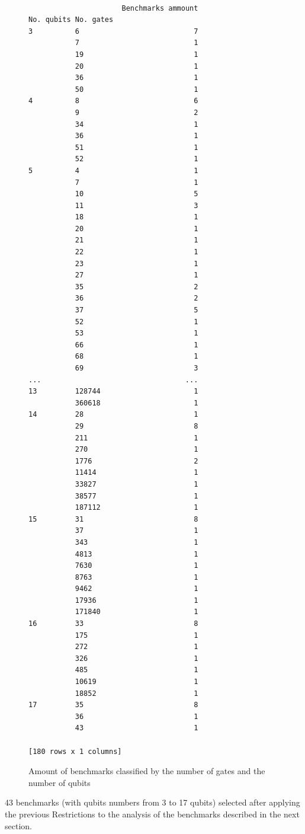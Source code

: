 \begin{figure}
\centering

\begin{verbatim}

                      Benchmarks ammount
No. qubits No. gates
3          6                           7
           7                           1
           19                          1
           20                          1
           36                          1
           50                          1
4          8                           6
           9                           2
           34                          1
           36                          1
           51                          1
           52                          1
5          4                           1
           7                           1
           10                          5
           11                          3
           18                          1
           20                          1
           21                          1
           22                          1
           23                          1
           27                          1
           35                          2
           36                          2
           37                          5
           52                          1
           53                          1
           66                          1
           68                          1
           69                          3
...                                  ...
13         128744                      1
           360618                      1
14         28                          1
           29                          8
           211                         1
           270                         1
           1776                        2
           11414                       1
           33827                       1
           38577                       1
           187112                      1
15         31                          8
           37                          1
           343                         1
           4813                        1
           7630                        1
           8763                        1
           9462                        1
           17936                       1
           171840                      1
16         33                          8
           175                         1
           272                         1
           326                         1
           485                         1
           10619                       1
           18852                       1
17         35                          8
           36                          1
           43                          1

[180 rows x 1 columns]

\end{verbatim}



\label{code:q_gate_bench}
\caption{Amount of benchmarks classified by the number of gates and the number of qubits}
\end{figure}
43 benchmarks (with qubits numbers from 3 to 17 qubits) selected after applying the previous Restrictions to the analysis of the benchmarks described in the next section.

